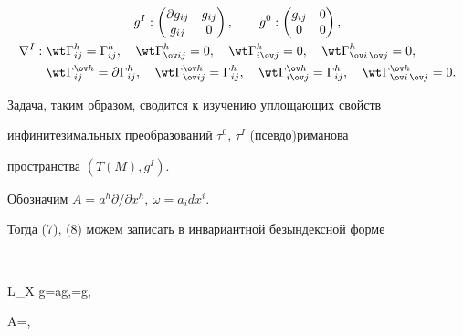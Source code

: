 \begin{gather*}


g^I:


\begin{pmatrix}


\partial g_{ij} & g_{ij} \\ g_{ij} & 0


\end{pmatrix}


,\qquad g^0:


\begin{pmatrix}


g_{ij} & 0 \\ 0 & 0


\end{pmatrix}


, \\


\begin{split}


\nabla^I:\; &\wt\Gamma^h_{ij}=\Gamma^h_{ij},\quad


\wt\Gamma^h_{\ov ij}=0,\quad \wt\Gamma^h_{i\ov j}=0,\quad


\wt\Gamma^h_{\ov i\,\ov j}=0, \\


&\wt\Gamma^{\ov h}_{ij}=\partial\Gamma^h_{ij},\quad


\wt\Gamma^{\ov h}_{\ov ij}=\Gamma^h_{ij},\quad


\wt\Gamma^{\ov h}_{i\ov j}=\Gamma^h_{ij},\quad


\wt\Gamma^{\ov h}_{\ov i\,\ov j}=0.


\end{split}


\end{gather*}


Задача, таким образом, сводится к изучению уплощающих свойств


инфинитезимальных преобразований $\tau^0$, $\tau^I$ (псевдо)риманова


пространства $(T(M),g^I)$.





Обозначим $A=a^h\partial/\partial x^h$, $\omega=a_i dx^i$.


Тогда (7), (8) можем записать в инвариантной безындексной форме


$$


L_X g=ag,\quad \nabla\omega=\varphi g,\quad


\nabla A=\varphi\delta,


